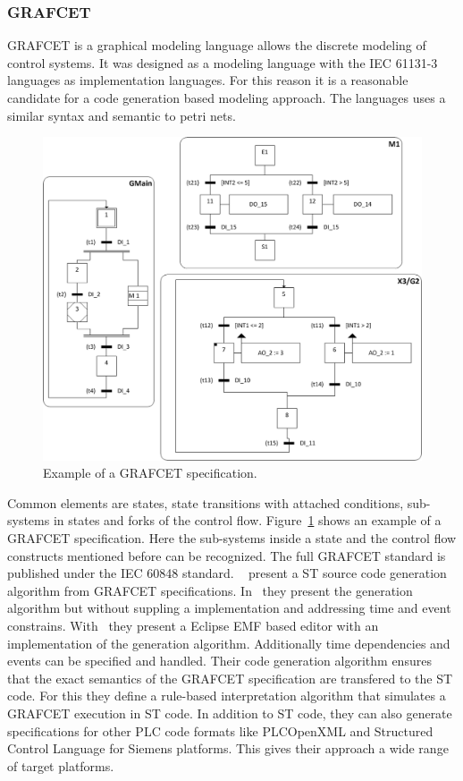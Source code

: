 \subsubsection{GRAFCET}
\label{sec:sub:grafcet}

GRAFCET is a graphical modeling language allows the discrete modeling of control systems.
It was designed as a modeling language with the IEC 61131-3 languages as implementation languages.
For this reason it is a reasonable candidate for a code generation based modeling approach.
The languages uses a similar syntax and semantic to petri nets.
\begin{figure}
	\includegraphics[width=\textwidth]{./Figures/grafcet_ex.jpg}
	\caption[Example of a GRAFCET specification.]{Example of a GRAFCET specification.~\cite{JULIUS2017173}}
	\label{fig:grafcet}
\end{figure}
Common elements are states, state transitions with attached conditions, sub-systems in states and forks of the control flow.
Figure~\ref{fig:grafcet} shows an example of a GRAFCET specification.
Here the sub-systems inside a state and the control flow constructs mentioned before can be recognized.
The full GRAFCET standard is published under the IEC 60848 standard.
\citeauthor{JULIUS20191767}~\cite{JULIUS20191767, JULIUS2017173} present a ST source code generation algorithm from GRAFCET specifications.
In~\cite{JULIUS2017173} they present the generation algorithm but without suppling a implementation and addressing time and event constrains.
With~\cite{JULIUS20191767} they present a Eclipse EMF based editor with an implementation of the generation algorithm.
Additionally time dependencies and events can be specified and handled.
Their code generation algorithm ensures that the exact semantics of the GRAFCET specification are transfered to the ST code.
For this they define a rule-based interpretation algorithm that simulates a GRAFCET execution in ST code.
In addition to ST code, they can also generate specifications for other PLC code formats like PLCOpenXML and Structured Control Language for Siemens platforms.
This gives their approach a wide range of target platforms.
